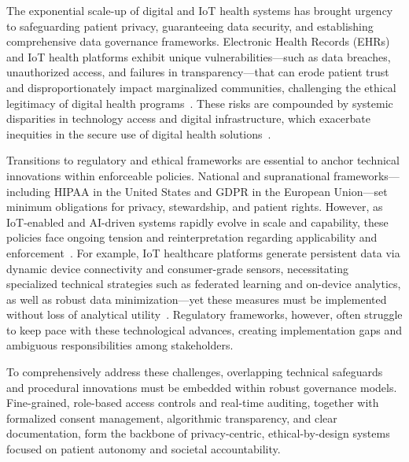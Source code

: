 \documentclass[sigconf]{acmart}
\begin{document}
The exponential scale-up of digital and IoT health systems has brought urgency to safeguarding patient privacy, guaranteeing data security, and establishing comprehensive data governance frameworks. Electronic Health Records (EHRs) and IoT health platforms exhibit unique vulnerabilities—such as data breaches, unauthorized access, and failures in transparency—that can erode patient trust and disproportionately impact marginalized communities, challenging the ethical legitimacy of digital health programs~\cite{ref2,ref6,ref7,ref8,ref9,ref10,ref24,ref25,ref28,ref30,ref46,ref50,ref51,ref61,ref63,ref64,ref70,ref82,ref83,ref84,ref106}. These risks are compounded by systemic disparities in technology access and digital infrastructure, which exacerbate inequities in the secure use of digital health solutions~\cite{ref84,ref106}.

Transitions to regulatory and ethical frameworks are essential to anchor technical innovations within enforceable policies. National and supranational frameworks—including HIPAA in the United States and GDPR in the European Union—set minimum obligations for privacy, stewardship, and patient rights. However, as IoT-enabled and AI-driven systems rapidly evolve in scale and capability, these policies face ongoing tension and reinterpretation regarding applicability and enforcement~\cite{ref2,ref4,ref5,ref6,ref7,ref8,ref9,ref10,ref24,ref25,ref28,ref30,ref31,ref33,ref34,ref35,ref36,ref41,ref43,ref46,ref50,ref54,ref51,ref61,ref62,ref63,ref64,ref65,ref70,ref71,ref72,ref75,ref76,ref77,ref78,ref79,ref82,ref83,ref84,ref90}. For example, IoT healthcare platforms generate persistent data via dynamic device connectivity and consumer-grade sensors, necessitating specialized technical strategies such as federated learning and on-device analytics, as well as robust data minimization—yet these measures must be implemented without loss of analytical utility~\cite{ref83,ref84,ref90}. Regulatory frameworks, however, often struggle to keep pace with these technological advances, creating implementation gaps and ambiguous responsibilities among stakeholders.

To comprehensively address these challenges, overlapping technical safeguards and procedural innovations must be embedded within robust governance models. Fine-grained, role-based access controls and real-time auditing, together with formalized consent management, algorithmic transparency, and clear documentation, form the backbone of privacy-centric, ethical-by-design systems focused on patient autonomy and societal accountability.
\end{document}
